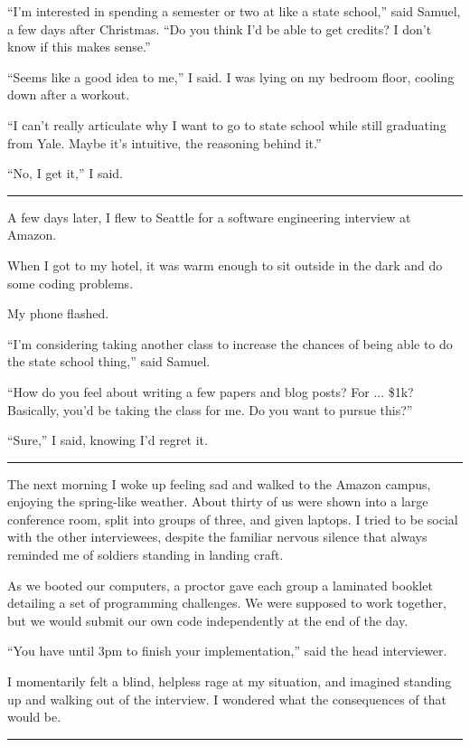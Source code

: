 ``I'm interested in spending a semester or two at like a state school,'' said
Samuel, a few days after Christmas.  ``Do you think I'd be able to get credits?
I don't know if this makes sense.''

``Seems like a good idea to me,'' I said.  I was lying on my bedroom floor,
cooling down after a workout.  

``I can't really articulate why I want to go to state school while still
graduating from Yale.   Maybe it's intuitive, the reasoning behind it.'' 

``No, I get it,'' I said. 

\plainfancybreak{12pt}{2}{* * *}

A few days later, I flew to Seattle for a software engineering interview at
Amazon.

When I got to my hotel, it was warm enough to sit outside in the dark and do
some coding problems.

My phone flashed.

``I'm considering taking another class to increase the chances of being able to
do the state school thing,'' said Samuel.  

``How do you feel about writing a few papers and blog posts?  For ... \$1k?
Basically, you'd be taking the class for me.  Do you want to pursue this?'' 

``Sure,'' I said, knowing I'd regret it.

\plainfancybreak{12pt}{2}{* * *}

The next morning I woke up feeling sad and walked to the Amazon campus, enjoying
the spring-like weather.  About thirty of us were shown into a large conference
room, split into groups of three, and given laptops.  I tried to be social with
the other interviewees, despite the familiar nervous silence that always
reminded me of soldiers standing in landing craft.

As we booted our computers, a proctor gave each group a laminated booklet
detailing a set of programming challenges.  We were supposed to work together,
but we would submit our own code independently at the end of the day.

``You have until 3pm to finish your implementation,'' said the head interviewer.

I momentarily felt a blind, helpless rage at my situation, and imagined standing
up and walking out of the interview.  I wondered what the consequences of that
would be.  

\plainfancybreak{12pt}{2}{* * *}

